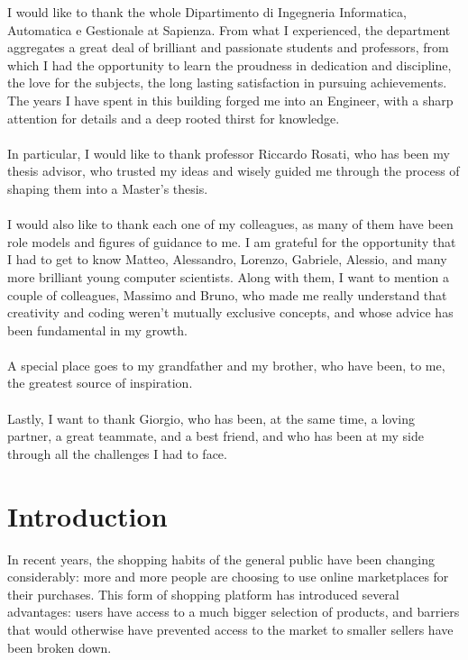 \documentclass[LaM,oneside,binding=0.6cm]{sapthesis}
\begin{document}
\begin{acknowledgments}
I would like to thank the whole Dipartimento di Ingegneria Informatica, Automatica e Gestionale at Sapienza. 
From what I experienced, the department aggregates a great deal of brilliant and passionate students and professors, from which I had the opportunity to learn the proudness in dedication and discipline, the love for the subjects, the long lasting satisfaction in pursuing achievements.
The years I have spent in this building forged me into an Engineer, with a sharp attention for details and a deep rooted thirst for knowledge.
\\
\\
In particular, I would like to thank professor Riccardo Rosati, who has been my thesis advisor, who trusted my ideas and wisely guided me through the process of shaping them into a Master's thesis.
\\
\\
I would also like to thank each one of my colleagues, as many of them have been role models and figures of guidance to me. I am grateful for the opportunity that I had to get to know Matteo, Alessandro, Lorenzo, Gabriele, Alessio, and many more brilliant young computer scientists. Along with them, I want to mention a couple of colleagues, Massimo and Bruno, who made me really understand that creativity and coding weren't mutually exclusive concepts, and whose advice has been fundamental in my growth.
\\ 
\\
A special place goes to my grandfather and my brother, who have been, to me, the greatest source of inspiration.
\\
\\
Lastly, I want to thank Giorgio, who has been, at the same time, a loving partner, a great teammate, and a best friend, and who has been at my side through all the challenges I had to face. 
\\

\end{acknowledgments}

\tableofcontents

\mainmatter

\chapter{Introduction}
 In recent years, the shopping habits of the general public have been changing considerably: more and more people are choosing to use online marketplaces for their purchases. This form of shopping platform has introduced several advantages: users have access to a much bigger selection of products, and barriers that would otherwise have prevented access to the market to smaller sellers have been broken down. \\
\end{document}
